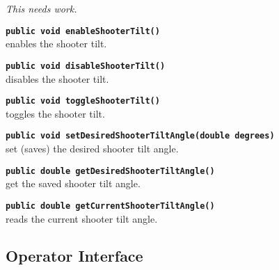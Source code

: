 \documentclass[]{article}
\begin{document}
\emph{This needs work.}

\noindent \texttt{\textbf{public void enableShooterTilt()}} \\
enables the shooter tilt.

\noindent \texttt{\textbf{public void disableShooterTilt()}} \\
disables the shooter tilt.

\noindent \texttt{\textbf{public void toggleShooterTilt()}} \\
toggles the shooter tilt.

\noindent \texttt{\textbf{public void setDesiredShooterTiltAngle(double degrees)}} \\
set (saves) the desired shooter tilt angle.

\noindent \texttt{\textbf{public double getDesiredShooterTiltAngle()}} \\
get the saved shooter tilt angle.

\noindent \texttt{\textbf{public double getCurrentShooterTiltAngle()}} \\
reads the current shooter tilt angle.


\subsection{Operator Interface}
\end{document}
